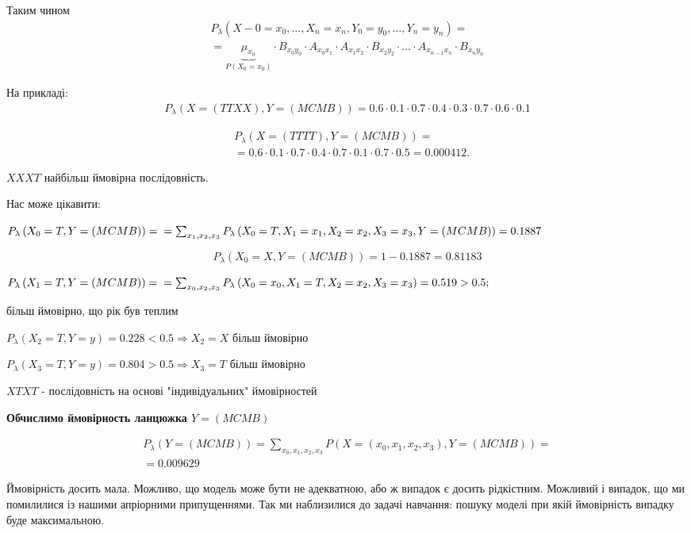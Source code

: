 \begin{example}
Таким чином
\begin{gather*}
P_{\lambda} \left( X-0 = x_0, \ldots, X_n = x_n, Y_0 = y_0, \ldots, Y_n = y_n \right) = \\
= \underbrace{\mu_{x_0}}_{P\left( X_0 = x_0 \right) }
\cdot B_{x_0 y_0} \cdot A_{x_0 x_1} \cdot A_{x_1 x_2} \cdot B_{x_2 y_2} \cdot
\ldots \cdot A_{x_{n-1} x_n} \cdot B_{x_n y_n}
\end{gather*}

На прикладі:
\begin{gather*}
P_{\lambda} \left( X = \left( TTXX \right), Y = \left( MCMB \right) \right) =
0.6 \cdot 0.1 \cdot 0.7 \cdot 0.4 \cdot 0.3 \cdot 0.7 \cdot 0.6 \cdot 0.1
\end{gather*}

\begin{align*}
  &P_{\lambda} \left( X = \left( TTTT \right), Y = \left( MCMB \right) \right) = \\
  &= 0.6 \cdot 0.1 \cdot 0.7 \cdot 0.4 \cdot 0.7 \cdot 0.1 \cdot 0.7 \cdot 0.5 = 0.000412
.\end{align*}

$XXXT$ найбільш ймовірна послідовність.

Нас може цікавити:

$P_{\lambda} \left( X_0 = T, Y = \left( MCMB \right)  \right) =\\
= \sum_{x_1, x_2, x_3}^{} P_{\lambda}\left( X_0 = T, X_1 = x_1, X_2 = x_2, X_3 = x_3,
  Y = \left( MCMB \right) \right) = 0.1887 $

\[
P_{\lambda}\left( X_0 = X, Y = \left( MCMB \right) \right) = 1 - 0.1887 = 0.81183
\]

$P_{\lambda}\left( X_1 = T, Y = \left( MCMB \right) \right) = \\
=\sum_{x_0, x_2, x_3}^{} P_{\lambda}\left( X_0 = x_0, X_1 = T, X_2 = x_2, X_3 = x_3 \right)
= 0.519 > 0.5;$

більш ймовірно, що рік був теплим

$P_{\lambda}\left( X_2 = T, Y = y \right) = 0.228 < 0.5 \Rightarrow X_2 = X$ більш ймовірно

$P_{\lambda}\left( X_3 = T, Y = y \right) = 0.804 > 0.5 \Rightarrow X_3 = T$ більш ймовірно

$XTXT$ - послідовність на основі "індивідуальних" ймовірностей

\textbf{Обчислимо ймовірность ланцюжка $Y = \left( MCMB \right)$}

\begin{gather*}
P_{\lambda} \left( Y = \left( MCMB \right)  \right) = \sum_{x_0, x_1, x_2, x_3}^{}
P\left( X = \left( x_0, x_1, x_2, x_3 \right), Y = \left( MCMB \right) \right) = \\
= 0.009629
\end{gather*}

Ймовірність досить мала. Можливо, що модель може бути не адекватною, або ж
випадок є досить рідкістним.
Можливий і випадок, що ми помилилися із нашими апріорними припущеннями.
Так ми наблизилися до задачі навчання: пошуку моделі при якій ймовірність
випадку буде максимальною.
\end{example}


